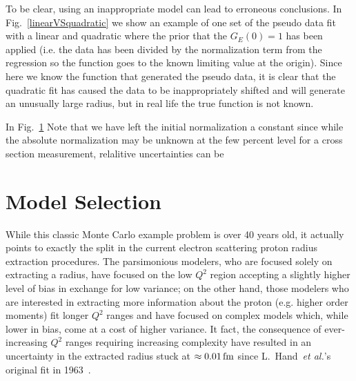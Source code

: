 \documentclass[10pt,aps,prc,twocolumn]{revtex4-1}
\begin{document}
To be clear, using an inappropriate model can lead to erroneous conclusions.
In Fig.~\ref{linearVSquadratic} we show an
example of one set of the pseudo data fit with a linear and quadratic where the prior that the
$G_E(0)=1$ has been applied (i.e. the data has been divided by the normalization term from the regression
so the function goes to the known limiting value at the origin).
Since here we know the function that generated the pseudo data, it is clear that the quadratic
fit has caused the data to be inappropriately shifted and will generate an unusually large radius, 
but in real life the true function is not known.

In Fig.~\ref{}
Note that we have left the initial normalization a constant since while the absolute normalization may be
unknown at the few percent level for a cross section measurement, relalitive uncertainties can be 


\section{Model Selection}

While this classic Monte Carlo example problem is over 40 years old, it actually points to exactly the split in 
the current electron scattering proton radius extraction procedures.     The parsimonious modelers, who are 
focused solely on extracting a radius, have focused on the low $Q^2$ region accepting a slightly higher 
level of bias in exchange for low variance; on the other hand, those modelers who are interested in extracting more information 
about the proton (e.g. higher order moments) fit longer $Q^2$ ranges and have
focused on complex models which, while lower in bias, come at a cost of higher variance.  
It fact, the consequence of ever-increasing $Q^2$ ranges requiring increasing complexity have resulted in
an uncertainty in the extracted radius 
stuck at $\approx \unit[0.01]{fm}$ since L.~Hand~\textit{et al.}'s original fit in 1963~\cite{Hand:1963zz}.
\end{document}
